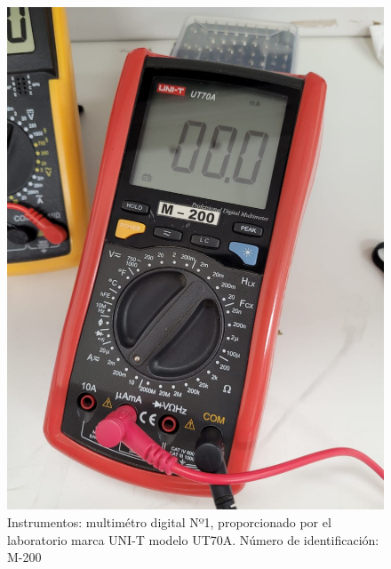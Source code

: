 \documentclass[chaptersright]{informeutn}
\begin{document}
\begin{figure}[H]
\begin{minipage}{0.3\textwidth}
            \includegraphics[width=\textwidth]{pictures/multimetro-facu.jpeg}
            \caption{Instrumentos: multimétro digital Nº1, proporcionado por el laboratorio marca UNI-T modelo UT70A. Número de identificación: M-200}
        \end{minipage}
    \end{figure}
\end{document}
